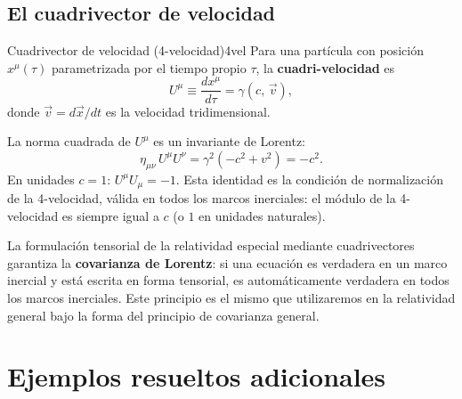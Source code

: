 \subsection{El cuadrivector de velocidad}

\begin{definicion}{Cuadrivector de velocidad (4-velocidad)}{4vel}
Para una partícula con posición $x^\mu(\tau)$ parametrizada por el tiempo propio $\tau$, la \textbf{cuadri-velocidad} es
\begin{equation}
  U^\mu \equiv \frac{dx^\mu}{d\tau} = \gamma\!\left(c,\,\vec{v}\right),
  \label{eq:4vel}
\end{equation}
donde $\vec{v} = d\vec{x}/dt$ es la velocidad tridimensional.
\end{definicion}

La norma cuadrada de $U^\mu$ es un invariante de Lorentz:
\begin{equation}
  \eta_{\mu\nu}\, U^\mu U^\nu = \gamma^2(-c^2 + v^2) = -c^2.
  \label{eq:norma_4vel}
\end{equation}
En unidades $c=1$: $U^\mu U_\mu = -1$. Esta identidad es la condición de normalización de la 4-velocidad, válida en todos los marcos inerciales: el módulo de la 4-velocidad es siempre igual a $c$ (o $1$ en unidades naturales).

\begin{importante}
La formulación tensorial de la relatividad especial mediante cuadrivectores garantiza la \textbf{covarianza de Lorentz}: si una ecuación es verdadera en un marco inercial y está escrita en forma tensorial, es automáticamente verdadera en todos los marcos inerciales. Este principio es el mismo que utilizaremos en la relatividad general bajo la forma del principio de covarianza general.
\end{importante}

\section{Ejemplos resueltos adicionales}

